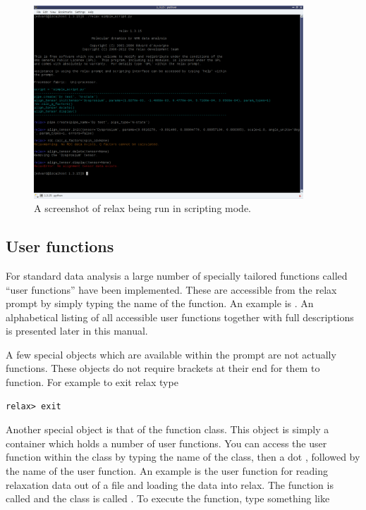 \begin{figure}
\centerline{\includegraphics[width=0.9\textwidth, bb=14 14 1065 768]{graphics/screenshots/relax_script_mode}}
\caption[Scripting screenshot]{A screenshot of relax being run in scripting mode.}\label{fig: relax script}
\end{figure}



\subsection{User functions}

For standard data analysis a large number of specially tailored functions called ``user functions'' have been implemented.  These are accessible from the relax prompt by simply typing the name of the function.  An example is .  An alphabetical listing of all accessible user functions together with full descriptions is presented later in this manual.

A few special objects which are available within the prompt are not actually functions.  These objects do not require brackets at their end for them to function.  For example to exit relax type

\begin{lstlisting}[numbers=none]
relax> exit
\end{lstlisting}

Another special object is that of the function class.  This object is simply a container which holds a number of user functions.  You can access the user function within the class by typing the name of the class, then a dot , followed by the name of the user function.  An example is the user function for reading relaxation data out of a file and loading the data into relax.  The function is called  and the class is called .  To execute the function, type something like

